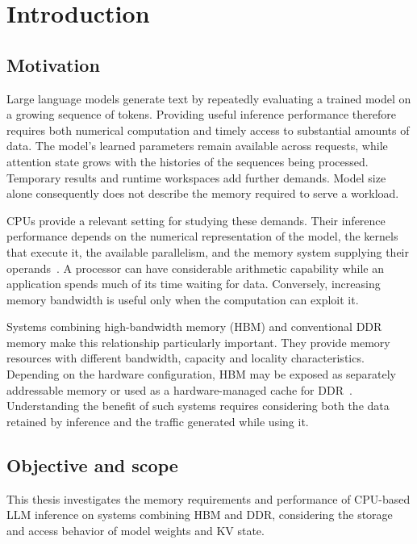 \chapter{Introduction}
\label{chap:introduction}

\section{Motivation}

Large language models generate text by repeatedly evaluating a trained
model on a growing sequence of tokens.  Providing useful inference
performance therefore requires both numerical computation and timely
access to substantial amounts of data.  The model's learned parameters
remain available across requests, while attention state grows with the
histories of the sequences being processed.  Temporary results and
runtime workspaces add further demands.  Model size alone consequently
does not describe the memory required to serve a workload.

CPUs provide a relevant setting for studying these demands.  Their
inference performance depends on the numerical representation of the
model, the kernels that execute it, the available parallelism, and the
memory system supplying their operands~\cite{na2024llmcpu}.  A processor
can have considerable arithmetic capability while an application spends
much of its time waiting for data.  Conversely, increasing memory
bandwidth is useful only when the computation can exploit it.

Systems combining high-bandwidth memory (HBM) and conventional DDR
memory make this relationship particularly important.  They provide
memory resources with different bandwidth, capacity and locality
characteristics.  Depending on the hardware configuration, HBM may be
exposed as separately addressable memory or used as a hardware-managed
cache for DDR~\cite{intelmaxoverview}.  Understanding the benefit of such
systems requires considering both the data retained by inference and
the traffic generated while using it.

\section{Objective and scope}

This thesis investigates the memory requirements and performance of
CPU-based LLM inference on systems combining HBM and DDR, considering
the storage and access behavior of model weights and KV state.

